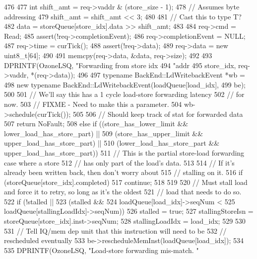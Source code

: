 \begin{DoxyCode}
{{{476 
477             int shift_amt = req->vaddr & (store_size - 1);
478             // Assumes byte addressing
479             shift_amt = shift_amt << 3;
480 
481             // Cast this to type T?
482             data = storeQueue[store_idx].data >> shift_amt;
483 
484             req->cmd = Read;
485             assert(!req->completionEvent);
486             req->completionEvent = NULL;
487             req->time = curTick();
488             assert(!req->data);
489             req->data = new uint8_t[64];
490 
491             memcpy(req->data, &data, req->size);
492 
493             DPRINTF(OzoneLSQ, "Forwarding from store idx %
494                     "addr %
495                     store_idx, req->vaddr, *(req->data));
496 
497             typename BackEnd::LdWritebackEvent *wb =
498                 new typename BackEnd::LdWritebackEvent(loadQueue[load_idx],
499                                                        be);
500 
501             // We'll say this has a 1 cycle load-store forwarding latency
502             // for now.
503             // FIXME - Need to make this a parameter.
504             wb->schedule(curTick());
505 
506             // Should keep track of stat for forwarded data
507             return NoFault;
508         } else if ((store_has_lower_limit && lower_load_has_store_part) ||
509                    (store_has_upper_limit && upper_load_has_store_part) ||
510                    (lower_load_has_store_part && upper_load_has_store_part)) {
511             // This is the partial store-load forwarding case where a store
512             // has only part of the load's data.
513 
514             // If it's already been written back, then don't worry about
515             // stalling on it.
516             if (storeQueue[store_idx].completed) {
517                 continue;
518             }
519 
520             // Must stall load and force it to retry, so long as it's the oldest
521             // load that needs to do so.
522             if (!stalled ||
523                 (stalled &&
524                  loadQueue[load_idx]->seqNum <
525                  loadQueue[stallingLoadIdx]->seqNum)) {
526                 stalled = true;
527                 stallingStoreIsn = storeQueue[store_idx].inst->seqNum;
528                 stallingLoadIdx = load_idx;
529             }
530 
531             // Tell IQ/mem dep unit that this instruction will need to be
532             // rescheduled eventually
533             be->rescheduleMemInst(loadQueue[load_idx]);
534 
535             DPRINTF(OzoneLSQ, "Load-store forwarding mis-match. "
}}}
\end{DoxyCode}
